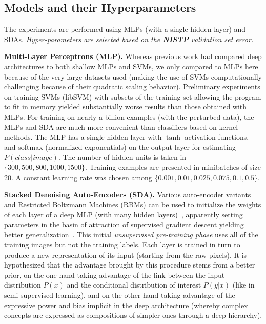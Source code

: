 \documentclass{article} %
\begin{document}
\subsection{Models and their Hyperparameters}

The experiments are performed using MLPs (with a single
hidden layer) and SDAs.
\emph{Hyper-parameters are selected based on the {\bf NISTP} validation set error.}

{\bf Multi-Layer Perceptrons (MLP).}
Whereas previous work had compared deep architectures to both shallow MLPs and
SVMs, we only compared to MLPs here because of the very large datasets used
(making the use of SVMs computationally challenging because of their quadratic
scaling behavior). Preliminary experiments on training SVMs (libSVM) with subsets of the training
set allowing the program to fit in memory yielded substantially worse results
than those obtained with MLPs. For training on nearly a billion examples
(with the perturbed data), the MLPs and SDA are much more convenient than
classifiers based on kernel methods.
The MLP has a single hidden layer with $\tanh$ activation functions, and softmax (normalized
exponentials) on the output layer for estimating $P(class | image)$.
The number of hidden units is taken in $\{300,500,800,1000,1500\}$. 
Training examples are presented in minibatches of size 20. A constant learning
rate was chosen among $\{0.001, 0.01, 0.025, 0.075, 0.1, 0.5\}$.


{\bf Stacked Denoising Auto-Encoders (SDA).}
Various auto-encoder variants and Restricted Boltzmann Machines (RBMs)
can be used to initialize the weights of each layer of a deep MLP (with many hidden 
layers)~\citep{Hinton06,ranzato-07-small,Bengio-nips-2006}, 
apparently setting parameters in the
basin of attraction of supervised gradient descent yielding better 
generalization~\citep{Erhan+al-2010}.  This initial {\em unsupervised
pre-training phase} uses all of the training images but not the training labels.
Each layer is trained in turn to produce a new representation of its input
(starting from the raw pixels).
It is hypothesized that the
advantage brought by this procedure stems from a better prior,
on the one hand taking advantage of the link between the input
distribution $P(x)$ and the conditional distribution of interest
$P(y|x)$ (like in semi-supervised learning), and on the other hand
taking advantage of the expressive power and bias implicit in the
deep architecture (whereby complex concepts are expressed as
compositions of simpler ones through a deep hierarchy).
\end{document}
